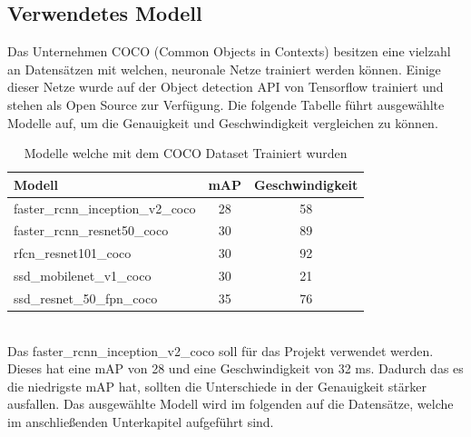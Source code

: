 \documentclass[a4paper,12pt,oneside]{article}
\begin{document}
 \subsection{Verwendetes Modell}\label{s.modell}
Das Unternehmen COCO \cite{common2018data} (Common Objects in Contexts) besitzen eine vielzahl an Datensätzen mit welchen, neuronale Netze trainiert werden können. Einige dieser Netze wurde auf der Object detection API von Tensorflow trainiert und stehen als Open Source zur Verfügung. Die folgende Tabelle führt ausgewählte Modelle auf, um die Genauigkeit und Geschwindigkeit vergleichen zu können.\\
\begin{table}
[h]
\caption{Modelle \cite{google2018tens} welche mit dem COCO Dataset Trainiert wurden \cite{common2018data}}
\centering
\begin{tabular}{|l|c|c|}
\hline
Modell & mAP & Geschwindigkeit\\
\hline
faster\_rcnn\_inception\_v2\_coco & 28 & 58\\
faster\_rcnn\_resnet50\_coco & 30 & 89\\
rfcn\_resnet101\_coco & 30 & 92\\
ssd\_mobilenet\_v1\_coco & 30 & 21\\
ssd\_resnet\_50\_fpn\_coco & 35 & 76\\
\hline
\end{tabular}
\end{table}\\
Das faster\_rcnn\_inception\_v2\_coco soll für das Projekt verwendet werden. Dieses hat eine mAP von 28 und eine Geschwindigkeit von 32 ms. Dadurch das es die niedrigste mAP hat, sollten die Unterschiede in der Genauigkeit stärker ausfallen. Das ausgewählte Modell wird im folgenden auf die Datensätze, welche im anschließenden Unterkapitel aufgeführt sind.
\end{document}
